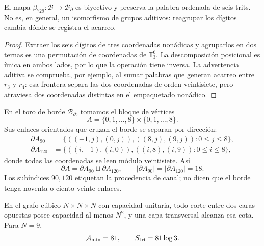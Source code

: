 \begin{proposition}
\label{prop:modular-beta729}
El mapa \(\beta_{729}:\mathcal B\to\mathcal B_\partial\) es biyectivo y
preserva la palabra ordenada de seis trits. No es, en general, un
isomorfismo de grupos aditivos: reagrupar los d\'igitos cambia d\'onde se
registra el acarreo.
\end{proposition}

\begin{proof}
Extraer los seis d\'igitos de tres coordenadas non\'adicas y agruparlos en
dos ternas es una permutaci\'on de coordenadas de \(\mathbb T_3^6\). La
descomposici\'on posicional es \`unica en ambos lados, por lo que la
operaci\'on tiene inversa. La advertencia aditiva se comprueba, por ejemplo,
al sumar palabras que generan acarreo entre \(r_3\) y \(r_4\): esa
frontera separa las dos coordenadas de orden veintisiete, pero atraviesa
dos coordenadas distintas en el empaquetado non\'adico.
\end{proof}

En el toro de borde \(\mathcal B_\partial\), tomamos el bloque de v\'ertices
\begin{equation}
\label{eq:modular-block-A}
A=\{0,1,\ldots,8\}\times\{0,1,\ldots,8\}.
\end{equation}
Sus enlaces orientados que cruzan el borde se separan por direcci\'on:
\begin{align}
\partial A_{90}
&=\{((-1,j),(0,j)),((8,j),(9,j)):0\leq j\leq8\},
\label{eq:modular-boundary90}\\
\partial A_{120}
&=\{((i,-1),(i,0)),((i,8),(i,9)):0\leq i\leq8\},
\label{eq:modular-boundary120}
\end{align}
donde todas las coordenadas se leen m\'odulo veintisiete. As\'i
\begin{equation}
\label{eq:modular-boundary-counts}
\partial A=\partial A_{90}\sqcup\partial A_{120},
\qquad
|\partial A_{90}|=|\partial A_{120}|=18.
\end{equation}
Los sub\'indices \(90,120\) etiquetan la procedencia de canal; no dicen que
el borde tenga noventa o ciento veinte enlaces.

\begin{theorem}
\label{thm:modular-triadic-cut}
En el grafo c\'ubico \(N\times N\times N\) con capacidad unitaria, todo
corte entre dos caras opuestas posee capacidad al menos \(N^2\), y una
capa transversal alcanza esa cota. Para \(N=9\),
\begin{equation}
\label{eq:modular-mincut-entropy}
\mathcal A_{\min}=81,
\qquad
S_{\rm tri}=81\log3.
\end{equation}
\end{theorem}

